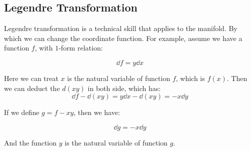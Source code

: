 \documentclass[../main.tex]{subfiles}
\begin{document}
\subsection{Legendre Transformation}

Legendre transformation is a technical skill that applies to the manifold. By which we can change the coordinate function. For example, assume we have a function $f$, with $1$-form relation:

\begin{equation}
    \dd f = y\dd x
\end{equation}

Here we can treat $x$ is the natural variable of function $f$, which is $f(x)$. Then we can deduct the $d(xy)$ in both side, which has:
\begin{equation}
    \dd{f}- \dd{(xy)} = y\dd{x} -\dd{(xy)} = -x\dd{y}
\end{equation}

If we define $g = f - xy$, then we have:

\begin{equation}
    \dd{g} = -x\dd{y}
\end{equation}

And the function $y$ is the natural variable of function $g$.
\end{document}
